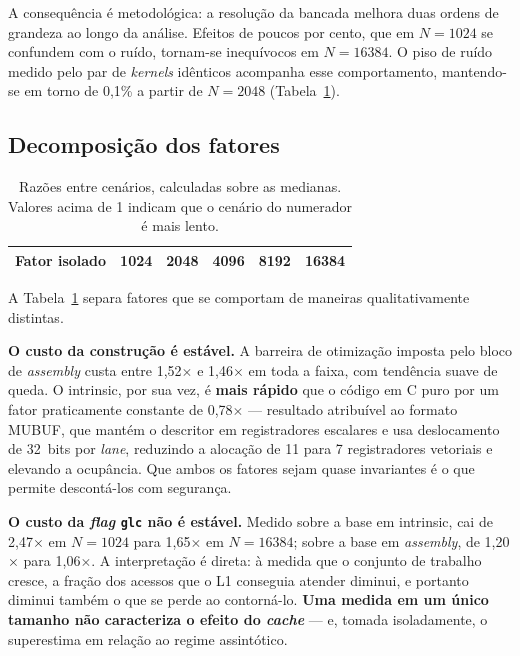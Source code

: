 \documentclass[12pt]{article}
\begin{document}
A consequência é metodológica: a resolução da bancada melhora duas ordens de
grandeza ao longo da análise. Efeitos de poucos por cento, que em $N=1024$ se
confundem com o ruído, tornam-se inequívocos em $N=16384$. O piso de ruído
medido pelo par de \textit{kernels} idênticos acompanha esse comportamento,
mantendo-se em torno de 0,1\% a partir de $N=2048$ (Tabela~\ref{tab:razoes}).

\subsection{Decomposição dos fatores}

\begin{table}[ht]
\centering
\caption{Razões entre cenários, calculadas sobre as medianas. Valores acima de
1 indicam que o cenário do numerador é mais lento.}
\label{tab:razoes}
\small
\begin{tabular}{@{}lrrrrr@{}}
\toprule
\textbf{Fator isolado} & \textbf{1024} & \textbf{2048} & \textbf{4096} &
\textbf{8192} & \textbf{16384} \\
\midrule

\bottomrule
\end{tabular}
\end{table}

A Tabela~\ref{tab:razoes} separa fatores que se comportam de maneiras
qualitativamente distintas.

\textbf{O custo da construção é estável.} A barreira de otimização imposta pelo
bloco de \textit{assembly} custa entre 1,52$\times$ e 1,46$\times$ em toda a
faixa, com tendência suave de queda. O intrinsic, por sua vez, é
\textbf{mais rápido} que o código em C puro por um fator praticamente constante
de 0,78$\times$ --- resultado atribuível ao formato MUBUF, que mantém o
descritor em registradores escalares e usa deslocamento de 32~bits por
\textit{lane}, reduzindo a alocação de 11 para 7 registradores vetoriais e
elevando a ocupância. Que ambos os fatores sejam quase invariantes é o que
permite descontá-los com segurança.

\textbf{O custo da \textit{flag} \texttt{glc} não é estável.} Medido sobre a
base em intrinsic, cai de 2,47$\times$ em $N=1024$ para 1,65$\times$ em
$N=16384$; sobre a base em \textit{assembly}, de 1,20$\times$ para 1,06$\times$.
A interpretação é direta: à medida que o conjunto de trabalho cresce, a fração
dos acessos que o L1 conseguia atender diminui, e portanto diminui também o que
se perde ao contorná-lo. \textbf{Uma medida em um único tamanho não caracteriza
o efeito do \textit{cache}} --- e, tomada isoladamente, o superestima em relação
ao regime assintótico.
\end{document}
